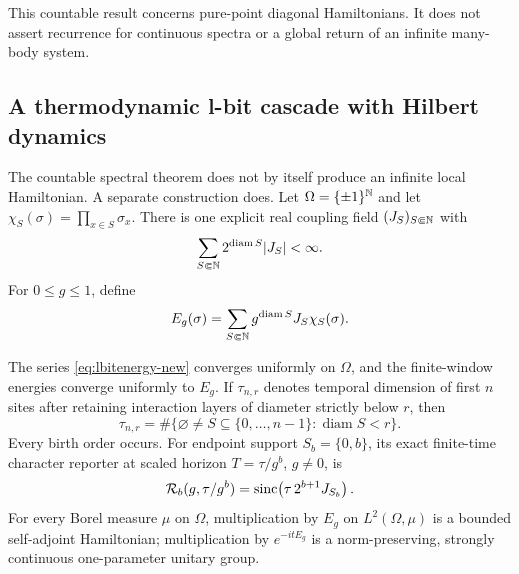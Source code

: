 This countable result concerns pure-point diagonal Hamiltonians.  It does not
assert recurrence for continuous spectra or a global return of an infinite
many-body system.

\subsection{A thermodynamic l-bit cascade with Hilbert dynamics}

The countable spectral theorem does not by itself produce an infinite local
Hamiltonian.  A separate construction does.  Let $\Omega=\{\pm1\}^{\mathbb N}$ and
let $\chi_S(\sigma)=\prod_{x\in S}\sigma_x$.  There is one explicit real
coupling field $(J_S)_{S\Subset\mathbb N}$ with
\begin{equation}
 \sum_{S\Subset\mathbb N}2^{\operatorname{diam}S}|J_S|<\infty.       \label{eq:lbitmass}
\end{equation}
For $0\le g\le1$, define
\begin{equation}
 E_g(\sigma)=\sum_{S\Subset\mathbb N}g^{\operatorname{diam}S}J_S\chi_S(\sigma).
 \label{eq:lbitenergy-new}
\end{equation}

\begin{theorem}
\label{thm:lbitcascade}
The series \eqref{eq:lbitenergy-new} converges uniformly on $\Omega$, and
the finite-window energies converge uniformly to $E_g$.  If
$\tau_{n,r}$ denotes temporal dimension of first $n$ sites after retaining
interaction layers of diameter strictly below $r$, then
\begin{equation}
 \tau_{n,r}=\#\{\varnothing\ne S\subseteq\{0,\ldots,n-1\}:
                   \operatorname{diam}S<r\}.                 \label{eq:lbitjetdim}
\end{equation}
Every birth order occurs.  For endpoint support $S_b=\{0,b\}$, its exact
finite-time character reporter at scaled horizon $T=\tau/g^b$, $g\ne0$, is
\begin{equation}
 \mathcal R_b(g,\tau/g^b)
   =\operatorname{sinc}\!\left(\tau\,2^{b+1}J_{S_b}\right).                \label{eq:lbitbirth}
\end{equation}
For every Borel measure $\mu$ on $\Omega$, multiplication by $E_g$ on
$L^2(\Omega,\mu)$ is a bounded self-adjoint Hamiltonian; multiplication by
$e^{-itE_g}$ is a norm-preserving, strongly continuous one-parameter
unitary group.
\end{theorem}

